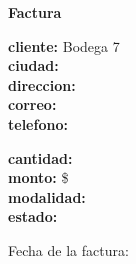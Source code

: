 \documentclass{article}
\begin{document}
\begin{center}
    {\LARGE \textbf{Factura}}\\[1cm]
\end{center}

\textbf{cliente:} Bodega 7 \\
\textbf{ciudad:}  \\
\textbf{direccion:}  \\
\textbf{correo:}  \\
\textbf{telefono:}  \\

\vspace{0.5cm}

\textbf{cantidad:}  \\
\textbf{monto:} \$ \\
\textbf{modalidad:}  \\
\textbf{estado:}  \\

\vspace{1cm}

Fecha de la factura: 
\end{document}
